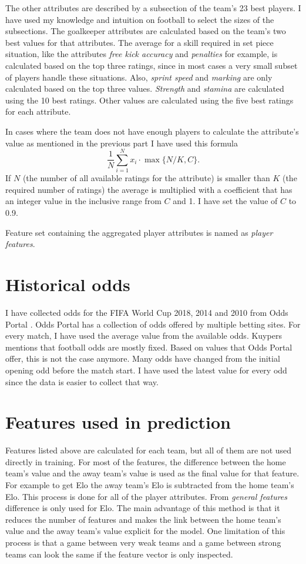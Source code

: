 The other attributes are described by a subsection of the team's 23 best players. I have used my knowledge and intuition on football to select the sizes of the subsections. The goalkeeper attributes are calculated based on the team's two best values for that attributes. The average for a skill required in set piece situation, like the attributes \textit{free kick accuracy} and \textit{penalties} for example, is calculated based on the top three ratings, since in most cases a very small subset of players handle these situations. Also, \textit{sprint speed} and \textit{marking} are only calculated based on the top three values. \textit{Strength} and \textit{stamina} are calculated using the 10 best ratings. Other values are calculated using the five best ratings for each attribute.

In cases where the team does not have enough players to calculate the attribute's value as mentioned in the previous part I have used this formula
\begin{equation}
\frac{1}{N}\sum_{i=1}^{N}x_i \cdot \max{\{N/K, C\}}.
\end{equation}
If $N$ (the number of all available ratings for the attribute) is smaller than $K$ (the required number of ratings) the average is multiplied with a coefficient that has an integer value in the inclusive range from $C$ and 1. I have set the value of $C$ to 0.9.

Feature set containing the aggregated player attributes is named as \textit{player features}.

\section{Historical odds}
I have collected odds for the FIFA World Cup 2018, 2014 and 2010 from Odds Portal \cite{oddsportal}. Odds Portal has a collection of odds offered by multiple betting sites. For every match, I have used the average value from the available odds. Kuypers \cite{kuypers2008} mentions that football odds are mostly fixed. Based on values that Odds Portal offer, this is not the case anymore. Many odds have changed from the initial opening odd before the match start. I have used the latest value for every odd since the data is easier to collect that way.

\section{Features used in prediction}
Features listed above are calculated for each team, but all of them are not used directly in training. For most of the features, the difference between the home team's value and the away team's value is used as the final value for that feature. For example to get Elo the away team's Elo is subtracted from the home team's Elo. This process is done for all of the player attributes. From \textit{general features} difference is only used for Elo. The main advantage of this method is that it reduces the number of features and makes the link between the home team's value and the away team's value explicit for the model. One limitation of this process is that a game between very weak teams and a game between strong teams can look the same if the feature vector is only inspected.


